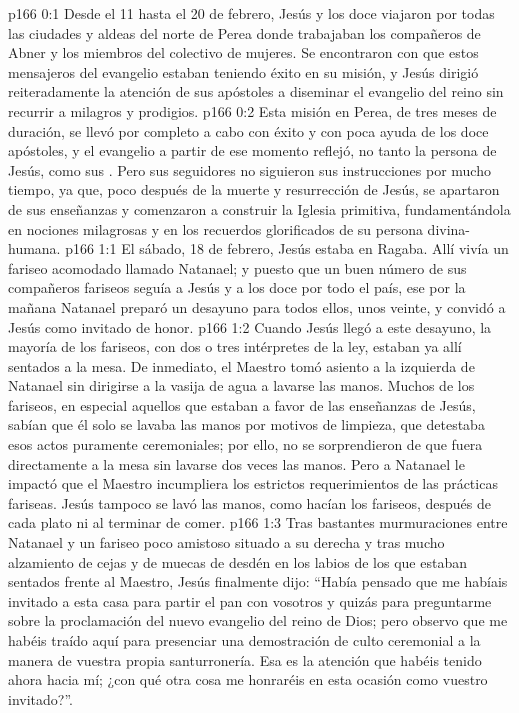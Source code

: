 \author{Comisión de seres intermedios}
\vs p166 0:1 Desde el 11 hasta el 20 de febrero, Jesús y los doce viajaron por todas las ciudades y aldeas del norte de Perea donde trabajaban los compañeros de Abner y los miembros del colectivo de mujeres. Se encontraron con que estos mensajeros del evangelio estaban teniendo éxito en su misión, y Jesús dirigió reiteradamente la atención de sus apóstoles a diseminar el evangelio del reino sin recurrir a milagros y prodigios.
\vs p166 0:2 Esta misión en Perea, de tres meses de duración, se llevó por completo a cabo con éxito y con poca ayuda de los doce apóstoles, y el evangelio a partir de ese momento reflejó, no tanto la persona de Jesús, como sus . Pero sus seguidores no siguieron sus instrucciones por mucho tiempo, ya que, poco después de la muerte y resurrección de Jesús, se apartaron de sus enseñanzas y comenzaron a construir la Iglesia primitiva, fundamentándola en nociones milagrosas y en los recuerdos glorificados de su persona divina\hyp{}humana.
\vs p166 1:1 El sábado, 18 de febrero, Jesús estaba en Ragaba. Allí vivía un fariseo acomodado llamado Natanael; y puesto que un buen número de sus compañeros fariseos seguía a Jesús y a los doce por todo el país, ese  por la mañana Natanael preparó un desayuno para todos ellos, unos veinte, y convidó a Jesús como invitado de honor.
\vs p166 1:2 Cuando Jesús llegó a este desayuno, la mayoría de los fariseos, con dos o tres intérpretes de la ley, estaban ya allí sentados a la mesa. De inmediato, el Maestro tomó asiento a la izquierda de Natanael sin dirigirse a la vasija de agua a lavarse las manos. Muchos de los fariseos, en especial aquellos que estaban a favor de las enseñanzas de Jesús, sabían que él solo se lavaba las manos por motivos de limpieza, que detestaba esos actos puramente ceremoniales; por ello, no se sorprendieron de que fuera directamente a la mesa sin lavarse dos veces las manos. Pero a Natanael le impactó que el Maestro incumpliera los estrictos requerimientos de las prácticas fariseas. Jesús tampoco se lavó las manos, como hacían los fariseos, después de cada plato ni al terminar de comer.
\vs p166 1:3 Tras bastantes murmuraciones entre Natanael y un fariseo poco amistoso situado a su derecha y tras mucho alzamiento de cejas y de muecas de desdén en los labios de los que estaban sentados frente al Maestro, Jesús finalmente dijo: “Había pensado que me habíais invitado a esta casa para partir el pan con vosotros y quizás para preguntarme sobre la proclamación del nuevo evangelio del reino de Dios; pero observo que me habéis traído aquí para presenciar una demostración de culto ceremonial a la manera de vuestra propia santurronería. Esa es la atención que habéis tenido ahora hacia mí; ¿con qué otra cosa me honraréis en esta ocasión como vuestro invitado?”.
